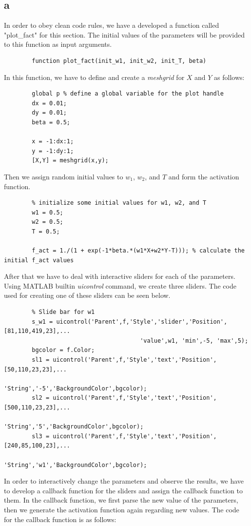 \documentclass[]{article}
\begin{document}
	\subsection*{a}
	In order to obey clean code rules, we have a developed a function called "plot\_fact" for this section. The initial values of the parameters will be provided to this function as input arguments.
	\begin{lstlisting}
		function plot_fact(init_w1, init_w2, init_T, beta)
	\end{lstlisting}
	 In this function, we have to define and create a \textit{meshgrid} for $X$ and $Y$ as follows:
	\begin{lstlisting}
		global p % define a global variable for the plot handle
		dx = 0.01;
		dy = 0.01;
		beta = 0.5;
		
		x = -1:dx:1;
		y = -1:dy:1;
		[X,Y] = meshgrid(x,y);
	\end{lstlisting}
	Then we assign random initial values to $w_1$, $w_2$, and $T$ and form the activation function.
	\begin{lstlisting}
		% initialize some initial values for w1, w2, and T
		w1 = 0.5;
		w2 = 0.5;
		T = 0.5;
		
		f_act = 1./(1 + exp(-1*beta.*(w1*X+w2*Y-T))); % calculate the initial f_act values
	\end{lstlisting}
	After that we have to deal with interactive sliders for each of the parameters. Using MATLAB builtin \textit{uicontrol} command, we create three sliders. The code used for creating one of these sliders can be seen below.
	\begin{lstlisting}
		% Slide bar for w1
		s_w1 = uicontrol('Parent',f,'Style','slider','Position',[81,110,419,23],...
									   'value',w1, 'min',-5, 'max',5);
		bgcolor = f.Color;
		sl1 = uicontrol('Parent',f,'Style','text','Position',[50,110,23,23],...
								   'String','-5','BackgroundColor',bgcolor);
		sl2 = uicontrol('Parent',f,'Style','text','Position',[500,110,23,23],...
								   'String','5','BackgroundColor',bgcolor);
		sl3 = uicontrol('Parent',f,'Style','text','Position',[240,85,100,23],...
								   'String','w1','BackgroundColor',bgcolor);
	\end{lstlisting}
	In order to interactively change the parameters and observe the results, we have to develop a callback function for the sliders and assign the callback function to them. In the callback function, we first parse the new value of the parameters, then we generate the activation function again regarding new values. The code for the callback function is as follows:
\end{document}
